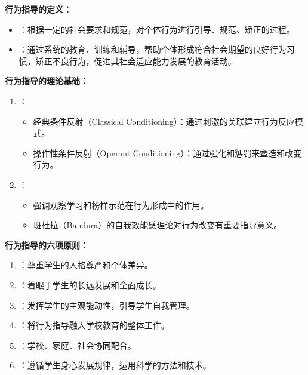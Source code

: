 \begin{defbox}
\textbf{行为指导的定义：}

\begin{itemize}[leftmargin=*]
    \item {}：根据一定的社会要求和规范，对个体行为进行引导、规范、矫正的过程。
    \item {}：通过系统的教育、训练和辅导，帮助个体形成符合社会期望的良好行为习惯，矫正不良行为，促进其社会适应能力发展的教育活动。
\end{itemize}

\textbf{行为指导的理论基础：}

\begin{enumerate}[leftmargin=*]
    \item {}：
    \begin{itemize}
        \item 经典条件反射（Classical Conditioning）：通过刺激的关联建立行为反应模式。
        \item 操作性条件反射（Operant Conditioning）：通过强化和惩罚来塑造和改变行为。
    \end{itemize}
    \item {}：
    \begin{itemize}
        \item 强调观察学习和榜样示范在行为形成中的作用。
        \item 班杜拉（Bandura）的自我效能感理论对行为改变有重要指导意义。
    \end{itemize}
\end{enumerate}

\textbf{行为指导的六项原则：}
\begin{enumerate}[leftmargin=*]
    \item {}：尊重学生的人格尊严和个体差异。
    \item {}：着眼于学生的长远发展和全面成长。
    \item {}：发挥学生的主观能动性，引导学生自我管理。
    \item {}：将行为指导融入学校教育的整体工作。
    \item {}：学校、家庭、社会协同配合。
    \item {}：遵循学生身心发展规律，运用科学的方法和技术。
\end{enumerate}
\end{defbox}

